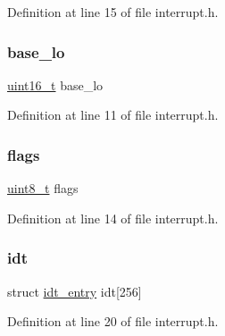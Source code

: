 Definition at line 15 of file interrupt.\+h.

\mbox{\label{a00017_a1a4688f97e405d4c0700427f4b74a355_a1a4688f97e405d4c0700427f4b74a355}} 
\subsubsection{\texorpdfstring{base\+\_\+lo}{base\_lo}}
{\footnotesize\ttfamily \hyperlink{a00032_a273cf69d639a59973b6019625df33e30_a273cf69d639a59973b6019625df33e30}{uint16\+\_\+t} base\+\_\+lo}



Definition at line 11 of file interrupt.\+h.

\mbox{\label{a00017_aa2585d779da0ab21273a8d92de9a0ebe_aa2585d779da0ab21273a8d92de9a0ebe}} 
\subsubsection{\texorpdfstring{flags}{flags}}
{\footnotesize\ttfamily \hyperlink{a00032_aba7bc1797add20fe3efdf37ced1182c5_aba7bc1797add20fe3efdf37ced1182c5}{uint8\+\_\+t} flags}



Definition at line 14 of file interrupt.\+h.

\mbox{\label{a00017_af69381381a1a2d28954b19bf08ae3b1a_af69381381a1a2d28954b19bf08ae3b1a}} 
\subsubsection{\texorpdfstring{idt}{idt}}
{\footnotesize\ttfamily struct \hyperlink{a00047}{idt\+\_\+entry} idt\mbox{[}256\mbox{]}}



Definition at line 20 of file interrupt.\+h.

\mbox{\label{a00017_a4bd16833092d3d6fb954727f65314ef0_a4bd16833092d3d6fb954727f65314ef0}} 
